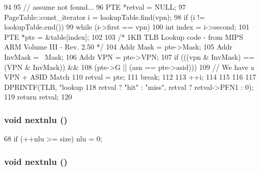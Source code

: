 \begin{DoxyCode}
94 {
95     // assume not found...
96     PTE *retval = NULL;
97     PageTable::const_iterator i = lookupTable.find(vpn);
98     if (i != lookupTable.end()) {
99         while (i->first == vpn) {
100             int index = i->second;
101             PTE *pte = &table[index];
102 
103             /* 1KB TLB Lookup code - from MIPS ARM Volume III - Rev. 2.50 */
104             Addr Mask = pte->Mask;
105             Addr InvMask = ~Mask;
106             Addr VPN  = pte->VPN;
107             if (((vpn & InvMask) == (VPN & InvMask)) &&
108                     (pte->G  || (asn == pte->asid))) {
109                 // We have a VPN + ASID Match
110                 retval = pte;
111                 break;
112             }
113             ++i;
114         }
115     }
116 
117     DPRINTF(TLB, "lookup %
118             retval ? "hit" : "miss", retval ? retval->PFN1 : 0);
119     return retval;
120 }
\end{DoxyCode}
\hypertarget{classMipsISA_1_1TLB_aeb5ba263cf2621ed26767046ab78a1dc}{
\subsubsection[{nextnlu}]{\setlength{\rightskip}{0pt plus 5cm}void nextnlu ()}}
\label{classMipsISA_1_1TLB_aeb5ba263cf2621ed26767046ab78a1dc}



\begin{DoxyCode}
68 { if (++nlu >= size) nlu = 0; }
\end{DoxyCode}
\hypertarget{classMipsISA_1_1TLB_aeb5ba263cf2621ed26767046ab78a1dc}{
\subsubsection[{nextnlu}]{\setlength{\rightskip}{0pt plus 5cm}void nextnlu ()}}
\label{classMipsISA_1_1TLB_aeb5ba263cf2621ed26767046ab78a1dc}



